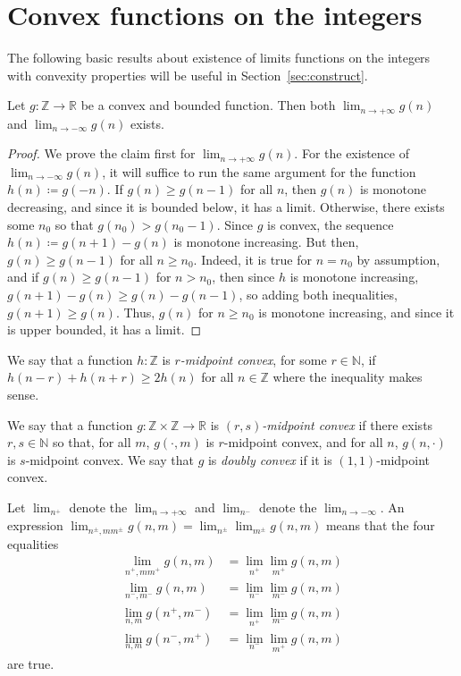  \section{Convex functions on the integers}
 \label{sec:convexity}
 
 The following basic results about existence of limits functions on the integers with convexity properties will be useful in Section~\ref{sec:construct}.

 
 \begin{lemma}
 Let $g \colon \mathbb{\mathbb{Z}} \to \mathbb{R}$ be a convex and bounded function.
 Then both $\lim_{n \to +\infty} g(n)$ and  $\lim_{n \to -\infty} g(n)$ exists.
 \label{lem:onevarconvexbounded}
 \end{lemma}
 \begin{proof}
 We prove the claim first for $\lim_{n \to +\infty} g(n)$. For the existence of $\lim_{n \to -\infty} g(n)$, it will suffice to run the same argument for the function $h(n) \coloneqq g(-n)$.
 If $g(n) \geq g(n-1)$ for all $n$, then $g(n)$ is monotone decreasing, and since it is bounded below, it has a limit.
 Otherwise, there exists some $n_0$ so that $g(n_0) > g(n_0-1)$. Since $g$ is convex, the sequence $h(n) \coloneqq g(n+1)-g(n)$ is monotone increasing.
 But then, $g(n) \geq g(n-1)$ for all $n \geq n_0$.
 Indeed, it is true for $n=n_0$ by assumption, and if $g(n) \geq g(n-1)$ for $n > n_0$, then since $h$ is monotone increasing, $g(n+1)-g(n) \geq g(n)-g(n-1)$, so adding both inequalities, $g(n+1) \geq g(n)$.
 Thus, $g(n)$ for $n \geq n_0$ is monotone increasing, and since it is upper bounded, it has a limit.
 \end{proof}
 
 
 We say that a function $h \colon \mathbb{Z}$ is \emph{$r$-midpoint convex}, for some $r \in \mathbb{N}$, if $h(n-r) + h(n+r) \geq 2 h(n)$ for all $n \in \mathbb{Z}$ where the inequality makes sense.
 
 We say that a function $g \colon \mathbb{Z} \times \mathbb{Z} \to \mathbb{R}$ is \emph{$(r,s)$-midpoint convex} if there exists $r,s \in \mathbb{N}$ so that, for all $m$, $g(\cdot, m)$ is $r$-midpoint convex, and for all $n$, $g(n, \cdot)$ is $s$-midpoint convex.
 We say that $g$ is \emph{doubly convex} if it is $(1,1)$-midpoint convex.
 
 Let $\lim_{n^{+}}$ denote the $\lim_{n \to +\infty}$ and $\lim_{n^{-}}$ denote the $\lim_{n \to -\infty}$.
 An expression $\lim_{n^{\pm},mm^{\pm}} g(n,m) = \lim_{n^{\pm}}
 \lim_{m^{\pm}} g(n,m)$ means that the four equalities
 \begin{align*}
   \lim_{n^{+},mm^{+}} g(n,m) &= \lim_{n^{+}} \lim_{m^{+}} g(n,m)\\
   \lim_{n^{-},m^{-}} g(n,m) &= \lim_{n^{-}} \lim_{m^{-}} g(n,m)\\
   \lim_{n,m} g(n^{+},m^{-}) &= \lim_{n^{+}} \lim_{m^{-}} g(n,m)\\
   \lim_{n,m} g(n^{-},m^{+}) &= \lim_{n^{-}} \lim_{m^{+}} g(n,m)
 \end{align*}
 are true.
 
